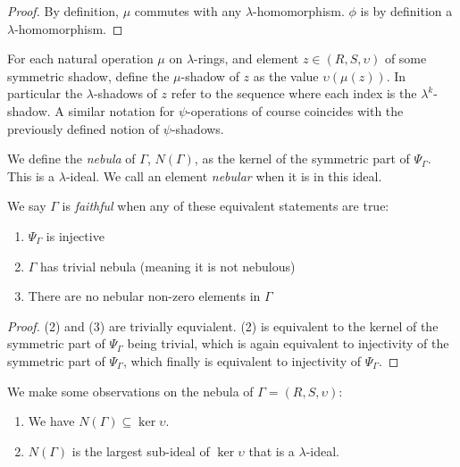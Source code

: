 \begin{proof}
  By definition, $\mu$ commutes with any $\lambda$-homomorphism. $\phi$ is by definition a $\lambda$-homomorphism. \qedhere
\end{proof}

\begin{definition}
  For each natural operation $\mu$ on $\lambda$-rings, and element $z \in (R, S, \upsilon)$ of some symmetric shadow, define the $\mu$-shadow of $z$ as the value $\upsilon(\mu(z))$. In particular the $\lambda$-shadows of $z$ refer to the sequence where each index is the $\lambda^k$-shadow. A similar notation for $\psi$-operations of course coincides with the previously defined notion of $\psi$-shadows.
\end{definition}

\begin{definition}
  We define the \emph{nebula} of $\Gamma$, $N(\Gamma)$, as the kernel of the symmetric part of $\Psi_\Gamma$. This is a $\lambda$-ideal. We call an element \emph{nebular} when it is in this ideal.
\end{definition}

\begin{propdef}
  We say $\Gamma$ is \emph{faithful} when any of these equivalent statements are true:
  \begin{enumerate}
    \item $\Psi_\Gamma$ is injective
    \item $\Gamma$ has trivial nebula (meaning it is not nebulous)
    \item There are no nebular non-zero elements in $\Gamma$
  \end{enumerate}
\end{propdef}

\begin{proof}
  (2) and (3) are trivially equvialent. (2) is equivalent to the kernel of the symmetric part of $\Psi_\Gamma$ being trivial, which is again equivalent to injectivity of the symmetric part of $\Psi_\Gamma$, which finally is equivalent to injectivity of $\Psi_\Gamma$.
\end{proof}

\begin{proposition} 
  We make some observations on the nebula of $\Gamma = (R, S, \upsilon)$:
  \begin{enumerate}
    \item We have $N(\Gamma) \subseteq \ker \upsilon$. 
    \item $N(\Gamma)$ is the largest sub-ideal of $\ker \upsilon$ that is a $\lambda$-ideal. 
  \end{enumerate}
\end{proposition}

